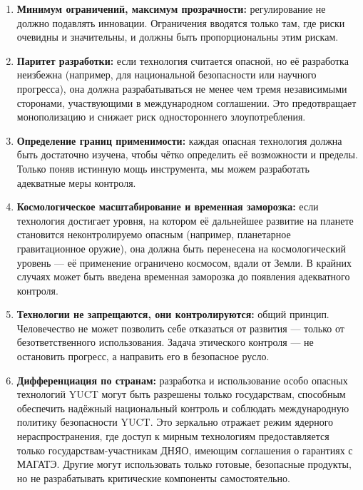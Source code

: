 \documentclass[12pt,a4paper]{article}
\theoremstyle{remark}
\begin{document}
	\begin{enumerate}[leftmargin=*]
		\item \textbf{Минимум ограничений, максимум прозрачности:} регулирование не должно подавлять инновации. Ограничения вводятся только там, где риски очевидны и значительны, и должны быть пропорциональны этим рискам.
		
		\item \textbf{Паритет разработки:} если технология считается опасной, но её разработка неизбежна (например, для национальной безопасности или научного прогресса), она должна разрабатываться не менее чем тремя независимыми сторонами, участвующими в международном соглашении. Это предотвращает монополизацию и снижает риск одностороннего злоупотребления.
		
		\item \textbf{Определение границ применимости:} каждая опасная технология должна быть достаточно изучена, чтобы чётко определить её возможности и пределы. Только поняв истинную мощь инструмента, мы можем разработать адекватные меры контроля.
		
		\item \textbf{Космологическое масштабирование и временная заморозка:} если технология достигает уровня, на котором её дальнейшее развитие на планете становится неконтролируемо опасным (например, планетарное гравитационное оружие), она должна быть перенесена на космологический уровень — её применение ограничено космосом, вдали от Земли. В крайних случаях может быть введена временная заморозка до появления адекватного контроля.
		
		\item \textbf{Технологии не запрещаются, они контролируются:} общий принцип. Человечество не может позволить себе отказаться от развития — только от безответственного использования. Задача этического контроля — не остановить прогресс, а направить его в безопасное русло.
		
		\item \textbf{Дифференциация по странам:} разработка и использование особо опасных технологий YUCT могут быть разрешены только государствам, способным обеспечить надёжный национальный контроль и соблюдать международную политику безопасности YUCT. Это зеркально отражает режим ядерного нераспространения, где доступ к мирным технологиям предоставляется только государствам-участникам ДНЯО, имеющим соглашения о гарантиях с МАГАТЭ. Другие могут использовать только готовые, безопасные продукты, но не разрабатывать критические компоненты самостоятельно.
	\end{enumerate}
	
\end{document}
